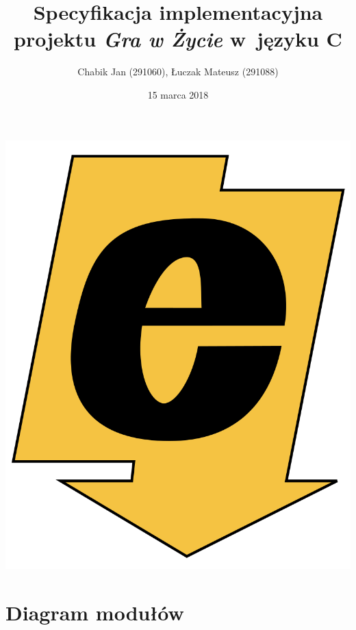 \documentclass[a4paper,12pt]{article}
\title{Specyfikacja implementacyjna projektu \textit{Gra w Życie} w~języku C}
\author{Chabik Jan (291060), Łuczak Mateusz (291088)}
\date{15 marca 2018}
\begin{document}
\maketitle
\thispagestyle{empty}
\begin{center}
	\includegraphics[scale=0.1]{logo_ee_big.png}
\end{center}
\newpage

\tableofcontents
{}
\newpage

\section{Diagram modułów}
\end{document}
